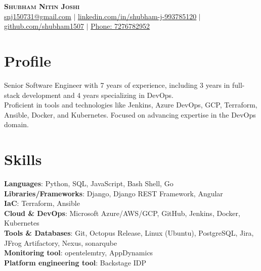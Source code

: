 \documentclass[letterpaper, 11pt]{article}
\begin{document}
\begin{center}
    \textbf{\Huge \scshape Shubham Nitin Joshi} \\
    \href{mailto:shubham.joshi1507@gmail.com}{\underline{snj150731@gmail.com}} $|$ 
    \href{https://www.linkedin.com/in/shubham-j-993785120/}{\underline{linkedin.com/in/shubham-j-993785120}} $|$
    \href{https://github.com/shubham1507}{\underline{github.com/shubham1507}} $|$
    \href{tel:8390246938}{\underline{Phone: 7276782952}}
\end{center}

\vspace{-15pt}

\section{Profile}
\small{
    Senior Software Engineer with 7 years of experience, including 3 years in full-stack development and 4 years specializing in DevOps. \\
    Proficient in tools and technologies like Jenkins, Azure DevOps, GCP, Terraform, Ansible, Docker, and Kubernetes. Focused on advancing expertise in the DevOps domain. \\
}

\vspace{-15pt}

\section{Skills}
\begin{itemize}[leftmargin=0.25in, label={}]
    \small{\item{
     \textbf{Languages}{: Python, SQL, JavaScript, Bash Shell, Go} \\
     \textbf{Libraries/Frameworks}{: Django, Django REST Framework, Angular} \\
     \textbf{IaC}{: Terraform, Ansible} \\
     \textbf{Cloud \& DevOps}{: Microsoft Azure/AWS/GCP, GitHub, Jenkins, Docker, Kubernetes} \\
     \textbf{Tools \& Databases}{: Git, Octopus Release, Linux (Ubuntu), PostgreSQL, Jira, JFrog Artifactory, Nexus, sonarqube} \\
     \textbf{Monitoring tool}{: opentelemtry, AppDynamics} \\
     \textbf{Platform engineering tool}{: Backstage IDP } \\
    }}\\
\end{itemize}
\end{document}
